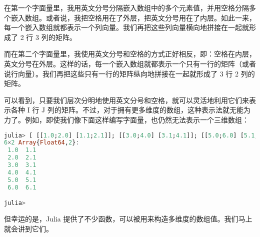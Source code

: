 在第一个字面量里，我用英文分号分隔嵌入数组中的多个元素值，并用空格分隔多个嵌入数组。或者说，我把空格用在了外层，把英文分号用在了内层。如此一来，每一个嵌入数组就都表示一个列向量。我们再把这些列向量横向地拼接在一起就形成了 2 行 3 列的矩阵。

而在第二个字面量里，我使用英文分号和空格的方式正好相反，即：空格在内层，英文分号在外层。这样的话，每一个嵌入数组就都表示一个只有一行的矩阵（或者说行向量）。我们再把这些只有一行的矩阵纵向地拼接在一起就形成了 3 行 2 列的矩阵。

可以看到，只要我们层次分明地使用英文分号和空格，就可以灵活地利用它们来表示各种 I 行 J 列的矩阵。不过，对于拥有更多维度的数组，这种表示法就无能为力了。例如，即使我们像下面这样编写字面量，也仍然无法表示一个三维数组：

\begin{lstlisting}[language=julia]
julia> [ [[1.0;2.0] [1.1;2.1]]; [[3.0;4.0] [3.1;4.1]]; [[5.0;6.0] [5.1;6.1]] ]
6×2 Array{Float64,2}:
 1.0  1.1
 2.0  2.1
 3.0  3.1
 4.0  4.1
 5.0  5.1
 6.0  6.1

julia> 
\end{lstlisting}

但幸运的是，Julia 提供了不少函数，可以被用来构造多维度的数组值。我们马上就会讲到它们。